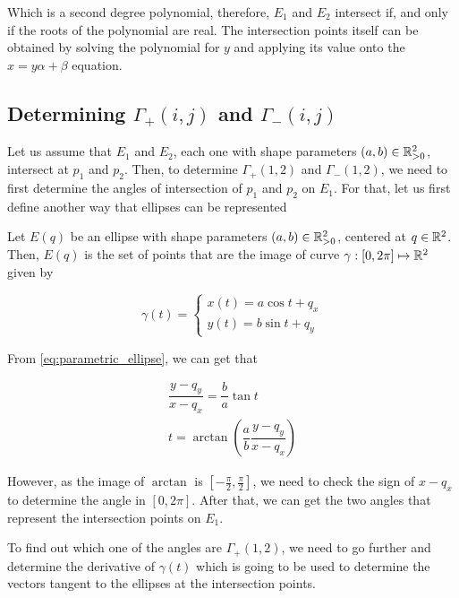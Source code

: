 Which is a second degree polynomial, therefore, $E_1$ and $E_2$ intersect if, and only if the roots of the polynomial are real. The intersection points itself can be obtained by solving the polynomial for $y$ and applying its value onto the $x=y\alpha + \beta$ equation.

\subsection{Determining $\Gamma_+(i,j)$ and $\Gamma_-(i,j)$}

Let us assume that $E_1$ and $E_2$, each one with shape parameters $(a,b) \in \mathbb{R}^2_{>0}$, intersect at $p_1$ and $p_2$. Then, to determine $\Gamma_+(1,2)$ and $\Gamma_-(1,2)$, we need to first determine the angles of intersection of $p_1$ and $p_2$ on $E_1$. For that, let us first define another way that ellipses can be represented

\begin{definicao}
Let $E(q)$ be an ellipse with shape parameters $(a,b)\in \mathbb{R}^2_{>0}$, centered at $q \in \mathbb{R}^2$. Then, $E(q)$ is the set of points that are the image of curve $\gamma : [0, 2\pi] \mapsto \mathbb{R}^2$ given by

\begin{equation}\label{eq:parametric_ellipse}
\gamma(t) = \left\{
\begin{array}{l}
x(t)= a\cos{t} + q_x\\
y(t)=b\sin{t} + q_y
\end{array}
\right.
\end{equation}

\end{definicao}

From \autoref{eq:parametric_ellipse}, we can get that

\begin{align*}
\dfrac{y-q_y}{x-q_x} = \dfrac{b}{a}\tan{t}\\
t=\arctan\left(\dfrac{a}{b} \dfrac{y-q_y}{x-q_x}\right)
\end{align*}

However, as the image of $\arctan$ is $[-\frac{\pi}{2}, \frac{\pi}{2}]$, we need to check the sign of $x-q_x$ to determine the angle in $[0, 2\pi]$. After that, we can get the two angles that represent the intersection points on $E_1$.

To find out which one of the angles are $\Gamma_+(1,2)$, we need to go further and determine the derivative of $\gamma(t)$ which is going to be used to determine the vectors tangent to the ellipses at the intersection points.

